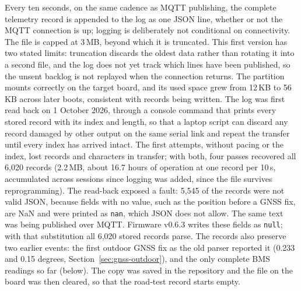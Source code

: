 Every ten seconds, on the same cadence as MQTT publishing, the complete telemetry record is appended to the log as one JSON line, whether or not the MQTT connection is up; logging is deliberately not conditional on connectivity. The file is capped at 3\,MB, beyond which it is truncated. This first version has two stated limits: truncation discards the oldest data rather than rotating it into a second file, and the log does not yet track which lines have been published, so the unsent backlog is not replayed when the connection returns. The partition mounts correctly on the target board, and its used space grew from 12\,KB to 56\,KB across later boots, consistent with records being written. The log was first read back on 1 October 2026, through a console command that prints every stored record with its index and length, so that a laptop script can discard any record damaged by other output on the same serial link and repeat the transfer until every index has arrived intact. The first attempts, without pacing or the index, lost records and characters in transfer; with both, four passes recovered all 6,020 records (2.2\,MB, about 16.7 hours of operation at one record per 10\,s, accumulated across sessions since logging was added, since the file survives reprogramming). The read-back exposed a fault: 5,545 of the records were not valid JSON, because fields with no value, such as the position before a GNSS fix, are NaN and were printed as \texttt{nan}, which JSON does not allow. The same text was being published over MQTT. Firmware v0.6.3 writes these fields as \texttt{null}; with that substitution all 6,020 stored records parse. The records also preserve two earlier events: the first outdoor GNSS fix as the old parser reported it (0.233 and 0.15 degrees, Section~\ref{sec:gnss-outdoor}), and the only complete BMS readings so far (below). The copy was saved in the repository and the file on the board was then cleared, so that the road-test record starts empty.

